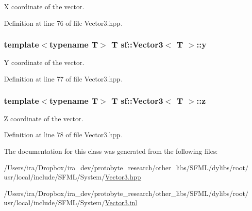 X coordinate of the vector. 



Definition at line 76 of file Vector3.\-hpp.

\hypertarget{classsf_1_1_vector3_a6590d50ccb862c5efc5512e974e9b794}{
\subsubsection[{y}]{\setlength{\rightskip}{0pt plus 5cm}template$<$typename T$>$ T {\bf sf\-::\-Vector3}$<$ T $>$\-::{\bf y}}}\label{classsf_1_1_vector3_a6590d50ccb862c5efc5512e974e9b794}


Y coordinate of the vector. 



Definition at line 77 of file Vector3.\-hpp.

\hypertarget{classsf_1_1_vector3_a2f36ab4b552c028e3a9734c1ad4df7d1}{
\subsubsection[{z}]{\setlength{\rightskip}{0pt plus 5cm}template$<$typename T$>$ T {\bf sf\-::\-Vector3}$<$ T $>$\-::{\bf z}}}\label{classsf_1_1_vector3_a2f36ab4b552c028e3a9734c1ad4df7d1}


Z coordinate of the vector. 



Definition at line 78 of file Vector3.\-hpp.



The documentation for this class was generated from the following files\-:\begin{DoxyCompactItemize}
\item 
/\-Users/ira/\-Dropbox/ira\-\_\-dev/protobyte\-\_\-research/other\-\_\-libs/\-S\-F\-M\-L/dylibs/root/usr/local/include/\-S\-F\-M\-L/\-System/\hyperlink{_vector3_8hpp}{Vector3.\-hpp}\item 
/\-Users/ira/\-Dropbox/ira\-\_\-dev/protobyte\-\_\-research/other\-\_\-libs/\-S\-F\-M\-L/dylibs/root/usr/local/include/\-S\-F\-M\-L/\-System/\hyperlink{_vector3_8inl}{Vector3.\-inl}\end{DoxyCompactItemize}
